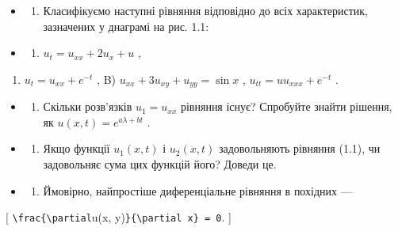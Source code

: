 \documentclass[
]{article}
\providecommand{\tightlist}{%
  \setlength{\itemsep}{0pt}\setlength{\parskip}{0pt}}
\begin{document}
\begin{itemize}
\tightlist
\item
  \begin{enumerate}
  \def\labelenumi{\arabic{enumi}.}
  \tightlist
  \item
    Класифікуємо наступні рівняння відповідно до всіх характеристик,
    зазначених у днаграмі на рис. 1.1:
  \end{enumerate}
\item
  \begin{enumerate}
  \def\labelenumi{\alph{enumi})}
  \tightlist
  \item
    \(u_t = u_{xx} + 2u_x + u\) ,
  \end{enumerate}
\end{itemize}

\begin{enumerate}
\def\labelenumi{\arabic{enumi})}
\setcounter{enumi}{5}
\tightlist
\item
  \(u_t = u_{xx} + e^{-t}\) , B) \(u_{xx} + 3u_{xy} + u_{yy} = \sin x\)
  , \(u_{tt} = uu_{xxx} + e^{-t}\) .
\end{enumerate}

\begin{itemize}
\tightlist
\item
  \begin{enumerate}
  \def\labelenumi{\arabic{enumi}.}
  \setcounter{enumi}{1}
  \tightlist
  \item
    Скільки розв'язків \(u_1 = u_{xx}\) рівняння існує? Спробуйте знайти
    рішення, як \(u(x, t) = e^{a\lambda + bt}\) .
  \end{enumerate}
\item
  \begin{enumerate}
  \def\labelenumi{\arabic{enumi}.}
  \setcounter{enumi}{2}
  \tightlist
  \item
    Якщо функції \(u_1(x, t)\) і \(u_2(x, t)\) задовольняють рівняння
    (1.1), чи задовольняє сума цих функцій його? Доведи це.
  \end{enumerate}
\item
  \begin{enumerate}
  \def\labelenumi{\arabic{enumi}.}
  \setcounter{enumi}{3}
  \tightlist
  \item
    Ймовірно, найпростіше диференціальне рівняння в похідних ---
  \end{enumerate}
\end{itemize}

{[} \texttt{\textbackslash{}frac\{\textbackslash{}partial}u(x,
y)\texttt{\}\{\textbackslash{}partial\ x\}\ =\ 0}. {]}
\end{document}

